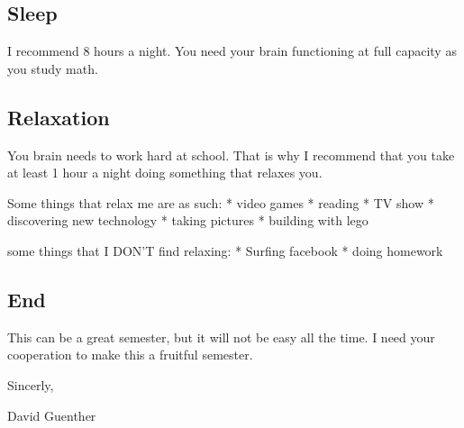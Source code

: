 \documentclass[]{article}
\begin{document}
\subsection{Sleep}\label{sleep}

I recommend 8 hours a night. You need your brain functioning at full
capacity as you study math.

\subsection{Relaxation}\label{relaxation}

You brain needs to work hard at school. That is why I recommend that you
take at least 1 hour a night doing something that relaxes you.

Some things that relax me are as such: * video games * reading * TV show
* discovering new technology * taking pictures * building with lego

some things that I DON'T find relaxing: * Surfing facebook * doing
homework

\subsection{End}\label{end}

This can be a great semester, but it will not be easy all the time. I
need your cooperation to make this a fruitful semester.

Sincerly,

David Guenther
\end{document}
